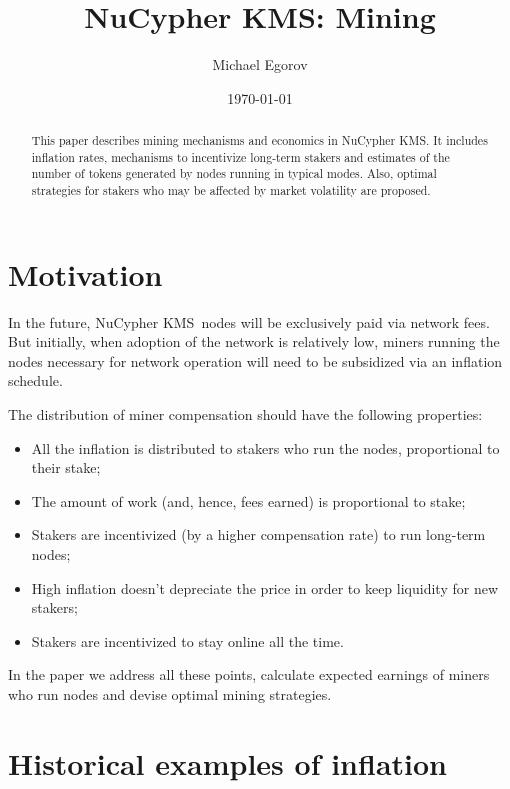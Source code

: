 \documentclass[longbibliography,nofootinbib,twocolumn]{revtex4-1}
\newcommand{\kms}{NuCypher KMS}
\begin{document}
\title{\kms: Mining}

\author{Michael Egorov}

\begin{abstract}
    This paper describes mining mechanisms and economics in \kms.
    It includes inflation rates, mechanisms to incentivize long-term stakers
    and estimates of the number of tokens generated by nodes running in typical modes.
    Also, optimal strategies for stakers who may be affected by market volatility are proposed.
\end{abstract}

\date{\today}
\maketitle

\section{Motivation}

In the future, \kms~nodes will be exclusively paid via network fees.
But initially, when adoption of the network is relatively low,
miners running the nodes necessary for network operation will need to be subsidized via an inflation schedule.

The distribution of miner compensation should have the following properties:
\begin{itemize}
    \item All the inflation is distributed to stakers who run the nodes, proportional to their stake;
    \item The amount of work (and, hence, fees earned) is proportional to stake;
    \item Stakers are incentivized (by a higher compensation rate) to run long-term nodes;
    \item High inflation doesn't depreciate the price in order to keep liquidity for new stakers;
    \item Stakers are incentivized to stay online all the time.
\end{itemize}

In the paper we address all these points, calculate expected earnings of miners who run nodes and devise optimal mining strategies.

\section{Historical examples of inflation}
\end{document}
